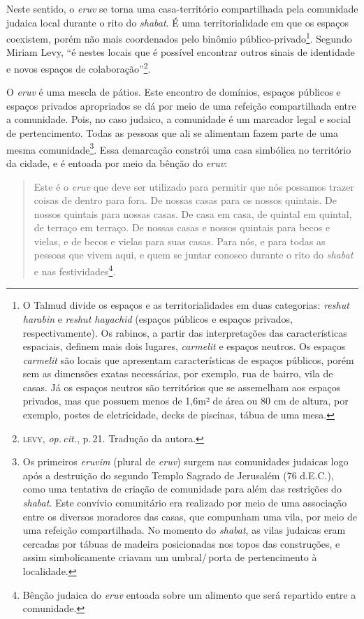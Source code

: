 Neste sentido, o \emph{eruv} se torna uma casa-território compartilhada
pela comunidade judaica local durante o rito do \emph{shabat}. É uma
territorialidade em que os espaços coexistem, porém não mais coordenados
pelo binômio público-privado\footnote{O Talmud divide os espaços
  e as territorialidades em duas categorias: \emph{reshut harabin} e
  \emph{reshut hayachid} (espaços públicos e espaços privados,
  respectivamente). Os rabinos, a partir das interpretações das
  características espaciais, definem mais dois lugares, \emph{carmelit}
  e espaços neutros. Os espaços \emph{carmelit} são locais que
  apresentam características de espaços públicos, porém sem as dimensões
  exatas necessárias, por exemplo, rua de bairro, vila de casas. Já os
  espaços neutros são territórios que se assemelham aos espaços
  privados, mas que possuem menos de 1,6m² de área ou 80 cm de altura,
  por exemplo, postes de eletricidade, decks de piscinas, tábua de uma
  mesa.}. Segundo Miriam Levy, ``é nestes locais que é possível
encontrar outros sinais de identidade e novos espaços de
colaboração''\footnote{\textsc{levy}, \emph{op.\,cit.}, p.\,21. Tradução da autora.}.

O \emph{eruv} é uma mescla de pátios. Este encontro de domínios, espaços
públicos e espaços privados apropriados se dá por meio de uma refeição
compartilhada entre a comunidade. Pois, no caso judaico, a comunidade é
um marcador legal e social de pertencimento. Todas as pessoas que ali se
alimentam fazem parte de uma mesma comunidade\footnote{Os primeiros
  \emph{eruvim} (plural de \emph{eruv}) surgem nas comunidades judaicas
  logo após a destruição do segundo Templo Sagrado de Jerusalém (76
  d.E.C.), como uma tentativa de criação de comunidade para além das
  restrições do \emph{shabat}. Este convívio comunitário era realizado
  por meio de uma associação entre os diversos moradores das casas, que
  compunham uma vila, por meio de uma refeição compartilhada. No momento
  do \emph{shabat}, as vilas judaicas eram cercadas por tábuas de
  madeira posicionadas nos topos das construções, e assim simbolicamente
  criavam um umbral/\,porta de pertencimento à localidade.}. Essa
demarcação constrói uma casa simbólica no território da cidade, e é
entoada por meio da bênção do \emph{eruv}:

\begin{quote}
Este é o \emph{eruv} que deve ser utilizado para permitir que nós possamos
trazer coisas de dentro para fora. De nossas casas para os nossos
quintais. De nossos quintais para nossas casas. De casa em casa, de
quintal em quintal, de terraço em terraço. De nossas casas e nossos
quintais para becos e vielas, e de becos e vielas para suas casas. Para
nós, e para todas as pessoas que vivem aqui, e quem se juntar conosco
durante o rito do \emph{shabat} e nas festividades\footnote{Bênção judaica do
  \emph{eruv} entoada sobre um alimento que será repartido entre a
  comunidade.}.
\end{quote}

